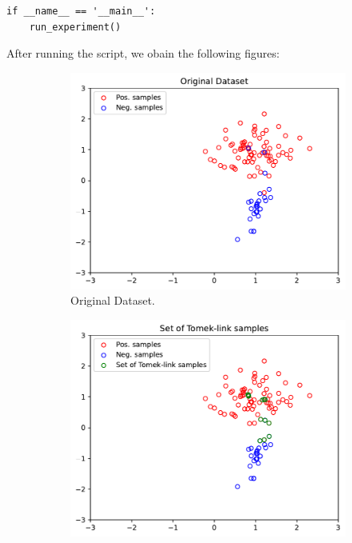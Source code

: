 \documentclass[a4paper]{article}
\begin{document}
{\begin{enumerate}
\begin{lstlisting}
if __name__ == '__main__':
    run_experiment()
\end{lstlisting}

After running the script, we obain the following figures:
\begin{figure}[h]
    \centering
    \begin{subfigure}{0.32\textwidth}
        \centering
        \includegraphics[width=\textwidth]{figures/original_dataset}
        \caption{Original Dataset.}
    \end{subfigure}
    \hfill
    \begin{subfigure}{0.32\textwidth}
        \centering
        \includegraphics[width=\textwidth]{figures/tomek_links}

\end{subfigure}
\end{figure}
\end{enumerate}}
\end{document}
